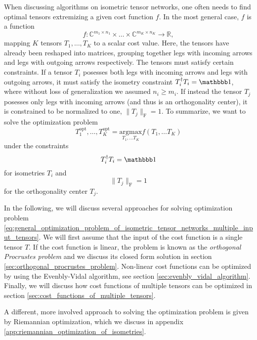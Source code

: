 When discussing algorithms on isometric tensor networks, one often needs to find optimal tensors extremizing a given cost function $f$. In the most general case, $f$ is a function
\begin{equation}
	\label{eq:general_optimization_problem_of_isometric_tensor_networks_cost_function_multiple_input_tensors}
	f:\mathbb{C}^{m_1\times n_1}\times \dots \times \mathbb{C}^{m_K\times n_K} \to \mathbb{R},
\end{equation}
mapping $K$ tensors $T_1,\dots,T_K$ to a scalar cost value. Here, the tensors have already been reshaped into matrices, grouping together legs with incoming arrows and legs with outgoing arrows respectively. The tensors must satisfy certain constraints. If a tensor $T_i$ posesses both legs with incoming arrows and legs with outgoing arrows, it must satisfy the isometry constraint $T_i^\dagger T_i = \id$, where without loss of generalization we assumed $n_i \ge m_i$. If instead the tensor $T_j$ posesses only legs with incoming arrows (and thus is an orthogonality center), it is constrained to be normalized to one, $\lVert T_j\rVert_\text{F} = 1$. To summarize, we want to solve the optimization problem
\begin{equation}
	\label{eq:general_optimization_problem_of_isometric_tensor_networks_multiple_input_tensors}
	T_1^\text{opt}, \dots, T_K^\text{opt} = \underset{T_1,\dots T_K}{\text{argmax}}f\left(T_1, \dots T_K\right)
\end{equation}
under the constraints
\begin{equation}
	\label{eq:general_optimization_problem_of_isometric_tensor_networks_isometry_constraint}
	T_i^\dagger T_i = \id
\end{equation}
for isometries $T_i$ and
\begin{equation}
	\label{eq:general_optimization_problem_of_isometric_tensor_networks_ortho_center_constraint}
	\lVert T_j\rVert_\text{F} = 1
\end{equation}
for the orthogonality center $T_j$. \par
In the following, we will discuss several approaches for solving optimization problem \eqref{eq:general_optimization_problem_of_isometric_tensor_networks_multiple_input_tensors}. We will first assume that the input of the cost function is a single tensor $T$. If the cost function is linear, the problem is known as the \textit{orthogonal Procrustes problem} and we discuss its closed form solution in section \ref{sec:orthogonal_procrustes_problem}. Non-linear cost functions can be optimized by using the Evenbly-Vidal algorithm, see section \ref{sec:evenbly_vidal_algorithm}. Finally, we will discuss how cost functions of multiple tensors can be optimized in section \ref{sec:cost_functions_of_multiple_tensors}. \par
A different, more involved approach to solving the optimization problem is given by Riemannian optimization, which we discuss in appendix \ref{app:riemannian_optimization_of_isometries}.


